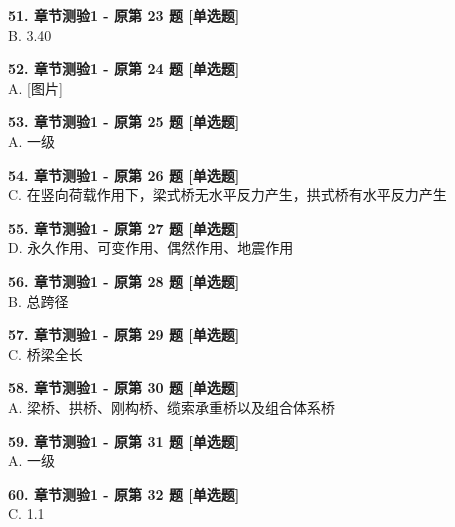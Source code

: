 \documentclass[UTF8,zihao=-4,openany]{ctexbook}
\begin{document}
\begin{answerline}
\textbf{51. 章节测验1 - 原第 23 题 [单选题]}\\
B. 3.40
\end{answerline}

\begin{answerline}
\textbf{52. 章节测验1 - 原第 24 题 [单选题]}\\
A. [图片]
\end{answerline}

\begin{answerline}
\textbf{53. 章节测验1 - 原第 25 题 [单选题]}\\
A. 一级
\end{answerline}

\begin{answerline}
\textbf{54. 章节测验1 - 原第 26 题 [单选题]}\\
C. 在竖向荷载作用下，梁式桥无水平反力产生，拱式桥有水平反力产生
\end{answerline}

\begin{answerline}
\textbf{55. 章节测验1 - 原第 27 题 [单选题]}\\
D. 永久作用、可变作用、偶然作用、地震作用
\end{answerline}

\begin{answerline}
\textbf{56. 章节测验1 - 原第 28 题 [单选题]}\\
B. 总跨径
\end{answerline}

\begin{answerline}
\textbf{57. 章节测验1 - 原第 29 题 [单选题]}\\
C. 桥梁全长
\end{answerline}

\begin{answerline}
\textbf{58. 章节测验1 - 原第 30 题 [单选题]}\\
A. 梁桥、拱桥、刚构桥、缆索承重桥以及组合体系桥
\end{answerline}

\begin{answerline}
\textbf{59. 章节测验1 - 原第 31 题 [单选题]}\\
A. 一级
\end{answerline}

\begin{answerline}
\textbf{60. 章节测验1 - 原第 32 题 [单选题]}\\
C. 1.1
\end{answerline}
\end{document}
